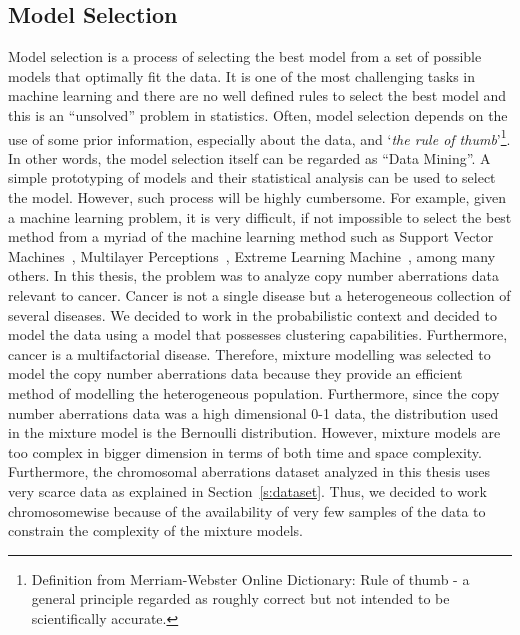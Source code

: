 \subsection{Model Selection}
\label{ss:modelselection}
Model selection is a process of selecting the best model from a set of possible models that optimally fit the data. It is one of the most challenging tasks in machine learning and there are no well defined rules to select the best model and this is an ``unsolved'' problem in statistics. Often, model selection depends on the use of some prior information, especially about the data, and `\textit{the rule of thumb}'\footnote{Definition from Merriam-Webster Online Dictionary: Rule of thumb - a general principle regarded as roughly correct but not intended to be scientifically accurate.}. In other words, the model selection itself can be regarded as ``Data Mining''. A simple prototyping of models and their statistical analysis can be used to select the model. However, such process will be highly cumbersome. For example, given a machine learning problem, it is very difficult, if not impossible to select the best method from a myriad of the machine learning method such as Support Vector Machines~\cite{svm, svm1}, Multilayer Perceptions~\cite{hykin, perceptron}, Extreme Learning Machine~\cite{elm}, among many others.  In this thesis, the problem was to analyze copy number aberrations data relevant to cancer. Cancer is not a single disease but a heterogeneous collection of several diseases. We decided to work in the probabilistic context and decided to model the data using a model that possesses clustering capabilities. Furthermore, cancer is a multifactorial disease. Therefore, mixture modelling was selected to model the copy number aberrations data because they provide an efficient method of modelling the heterogeneous population. Furthermore, since the copy number aberrations data was a high dimensional \mbox{0-1} data, the distribution used in the mixture model is the Bernoulli distribution. However, mixture models are too complex in bigger dimension in terms of both time and space complexity. Furthermore, the chromosomal aberrations dataset analyzed in this thesis uses very scarce data as explained in Section~\ref{s:dataset}. Thus, we decided to work  chromosomewise because of the availability of very few samples of the data to constrain the complexity of the mixture models. 


